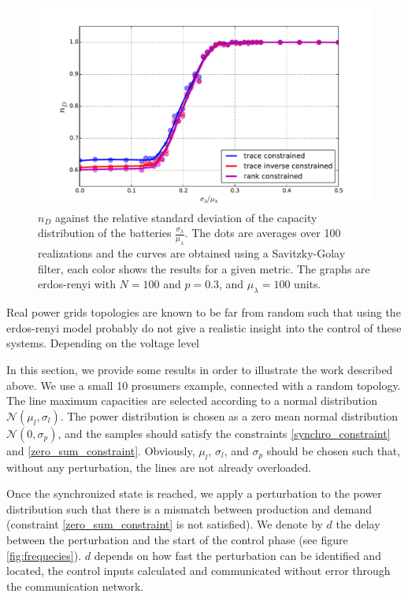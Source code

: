 \documentclass[conference]{IEEEtran}
\begin{document}
\begin{figure}
\label{fig:batteries_variance}
\includegraphics[scale=.37]{./figure_7/figure_7}
\caption{$n_D$ against the relative standard deviation of the capacity distribution of the batteries $ \frac{ \sigma_{ \lambda } }{ \mu_{ \lambda} } $. The dots are averages over 100 realizations and the curves are obtained using a Savitzky-Golay filter, each color shows the results for a given metric. The graphs are erdos-renyi with $N=100$ and $p=0.3$, and $\mu_{\lambda} = 100 $ units. }
\end{figure} 

Real power grids topologies are known to be far from random such that using the erdos-renyi model probably do not give a realistic insight into the control of these systems. Depending on the voltage level 

In this section, we provide some results in order to illustrate the work described above. We use a small 10 prosumers example, connected with a random topology. The line maximum capacities are selected  according to a normal distribution $\mathcal{N}(\mu_l,\sigma_l)$.  The power distribution is chosen as a zero mean normal distribution $ \mathcal{N}(0,\sigma_p) $, and the samples should satisfy the constraints \ref{synchro_constraint} and \ref{zero_sum_constraint}. Obviously, $\mu_l$, $\sigma_l$, and $\sigma_p$ should be chosen such that, without any perturbation, the lines are not already overloaded.



Once the synchronized state is reached, we apply a perturbation to the power distribution such that there is a mismatch between production and demand (constraint \ref{zero_sum_constraint} is not satisfied). We denote by $d$ the delay between the perturbation and the start of the control phase (see figure \ref{fig:frequecies}). $d$ depends on how fast the perturbation can be identified and located, the control inputs calculated and communicated without error through the communication network.
\end{document}
